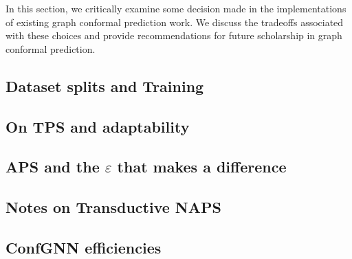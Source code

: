 In this section, we critically examine some decision made in the implementations of existing graph conformal prediction work.
We discuss the tradeoffs associated with these choices and provide recommendations for future scholarship in graph conformal prediction.

\subsection{Dataset splits and Training}



\subsection{On TPS and adaptability}


\subsection{APS and the $\varepsilon$ that makes a difference}



\subsection{Notes on Transductive NAPS}


\subsection{ConfGNN efficiencies}

